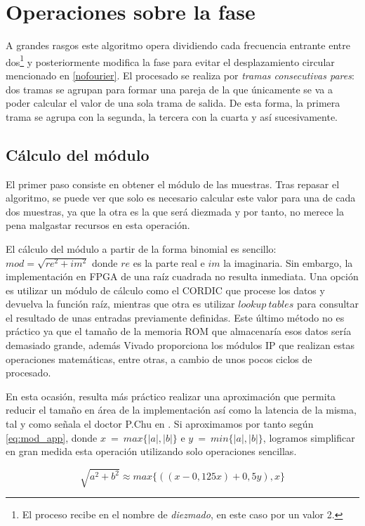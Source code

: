 \section{Operaciones sobre la fase}
A grandes rasgos este algoritmo opera dividiendo cada frecuencia entrante entre dos\footnote{El proceso recibe en \cite{Oppenheim} el nombre de \emph{diezmado}, en este caso por un valor 2.} y posteriormente modifica la fase para evitar el desplazamiento circular mencionado en \ref{nofourier}. El procesado se realiza por \emph{tramas consecutivas pares}: dos tramas se agrupan para formar una pareja de la que únicamente se va a poder calcular el valor de una sola trama de salida. De esta forma, la primera trama se agrupa con la segunda, la tercera con la cuarta y así sucesivamente.

\subsection{Cálculo del módulo}
El primer paso consiste en obtener el módulo de las muestras. Tras repasar el algoritmo, se puede ver que solo es necesario calcular este valor para una de cada dos muestras, ya que la otra es la que será diezmada y por tanto, no merece la pena malgastar recursos en esta operación. 

El cálculo del módulo a partir de la forma binomial es sencillo: $mod = \sqrt{re^{2}+im^{2}}$ donde $re$ es la parte real e $im$ la imaginaria. Sin embargo, la implementación en FPGA de una raíz cuadrada no resulta inmediata. Una opción es utilizar un módulo de cálculo como el CORDIC que procese los datos y devuelva la función raíz, mientras que otra es utilizar $lookup~tables$ para consultar el resultado de unas entradas previamente definidas. Este último método no es práctico ya que el tamaño de la memoria ROM que almacenaría esos datos sería demasiado grande, además Vivado proporciona los módulos IP que realizan estas operaciones matemáticas, entre otras, a cambio de unos pocos ciclos de procesado.

En esta ocasión, resulta más práctico realizar una aproximación que permita reducir el tamaño en área de la implementación así como la latencia de la misma, tal y como señala el doctor P.Chu en \cite{vhdlchu}. Si aproximamos por tanto según \ref{eq:mod_app}, donde $x~=~max\{|a|,|b|\}$ e $y~=~min\{|a|,|b|\}$, logramos simplificar en gran medida esta operación utilizando solo operaciones sencillas.

\begin{equation}
\label{eq:mod_app}
 \sqrt{a^{2}+b^{2}} \approx max\{((x - 0,125x) + 0,5y),x\}
\end{equation} 

